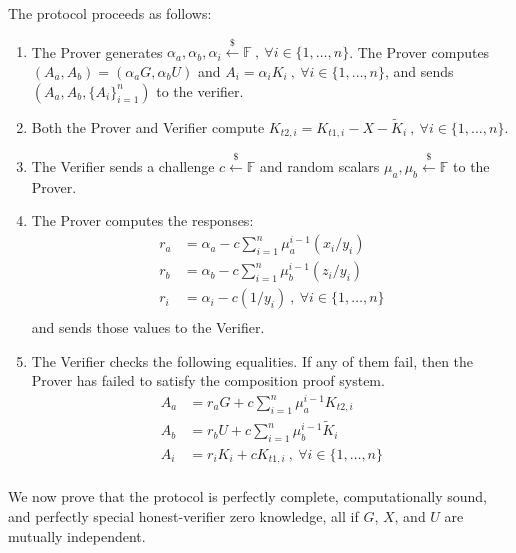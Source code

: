 \documentclass{article}
\begin{document}
The protocol proceeds as follows:
\begin{enumerate}
\item The Prover generates $\alpha_a, \alpha_b, \alpha_i \xleftarrow{\$}\mathbb{F}\ ,\ \forall i\in\{1,\ldots,n\}$. The Prover computes $(A_a, A_b) = (\alpha_a G, \alpha_b U)$ and $A_{i}=\alpha_i K_i\ ,\ \forall i\in\{1,\ldots,n\}$, and sends $(A_a, A_b, \{A_i\}_{i=1}^n)$ to the verifier.
\item Both the Prover and Verifier compute $K_{t2,i} = K_{t1,i} - X - \tilde{K}_i\ ,\ \forall i\in\{1,\ldots,n\}$.
\item The Verifier sends a challenge $c\xleftarrow{\$}\mathbb{F}$ and random scalars $\mu_a,\mu_b\xleftarrow{\$}\mathbb{F}$ to the Prover.
\item The Prover computes the responses:
\begin{align*}
r_{a} &= \alpha_a - c \sum_{i=1}^{n}{\mu_a^{i-1} (x_i/y_i)} \\
r_{b} &= \alpha_b - c \sum_{i=1}^{n}{\mu_b^{i-1}(z_i/y_i)} \\
r_{i} &= \alpha_i - c (1/y_i)\ ,\ \forall i\in\{1,\ldots,n\}\\
\end{align*}
and sends those values to the Verifier.
\item The Verifier checks the following equalities. If any of them fail, then the Prover has failed to satisfy the composition proof system.
\begin{align*}
A_{a} &= r_a G + c \sum_{i=1}^{n}{\mu_a^{i-1} K_{t2,i}} \\
A_{b} &= r_b U + c \sum_{i=1}^{n}{\mu_b^{i-1} \tilde{K}_i} \\
A_{i} &= r_i K_i + c K_{t1,i}\ ,\ \forall i\in\{1,\ldots,n\}\\
\end{align*}
\end{enumerate}
We now prove that the protocol is perfectly complete, computationally sound, and perfectly special honest-verifier zero knowledge, all if $G$, $X$, and $U$ are mutually independent.
\end{document}
